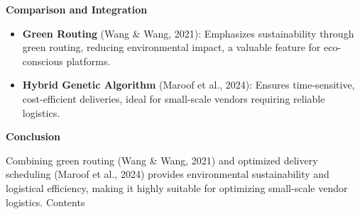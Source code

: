 \textbf{Comparison and Integration}

\begin{itemize}
    \item \textbf{Green Routing} (Wang \& Wang, 2021): Emphasizes sustainability through green routing, reducing environmental impact, a valuable feature for eco-conscious platforms.
    \item \textbf{Hybrid Genetic Algorithm} (Maroof et al., 2024): Ensures time-sensitive, cost-efficient deliveries, ideal for small-scale vendors requiring reliable logistics.
\end{itemize}

\textbf{Conclusion}

Combining green routing (Wang \& Wang, 2021) and optimized delivery scheduling (Maroof et al., 2024) provides environmental sustainability and logistical efficiency, making it highly suitable for optimizing small-scale vendor logistics.
Contents \cite{xu2023vitpose++}





